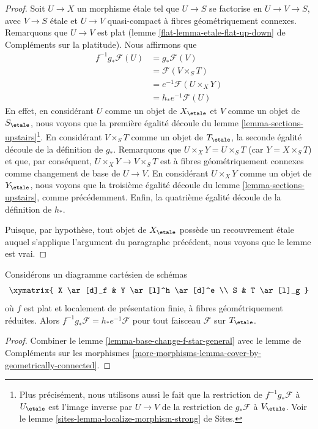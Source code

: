 \begin{proof}
Soit $U \to X$ un morphisme étale tel que $U \to S$ se factorise en
$U \to V \to S$, avec $V \to S$ étale et $U \to V$ quasi-compact
à fibres géométriquement connexes. Remarquons que $U \to V$ est plat
(lemme \ref{flat-lemma-etale-flat-up-down} de Compléments sur la platitude).
Nous affirmons que
\begin{align*}
f^{-1}g_*\mathcal{F}(U)
& = g_*\mathcal{F}(V) \\
& = \mathcal{F}(V \times_S T) \\
& = e^{-1}\mathcal{F}(U \times_X Y) \\
& = h_*e^{-1}\mathcal{F}(U)
\end{align*}
En effet, en considérant $U$ comme un objet de $X_\etale$ et
$V$ comme un objet de $S_\etale$, nous voyons que la première égalité
découle du lemme \ref{lemma-sections-upstairs}\footnote{Plus
précisément, nous utilisons aussi le fait que la restriction de $f^{-1}g_*\mathcal{F}$
à $U_\etale$ est l'image inverse par $U \to V$ de la restriction de
$g_*\mathcal{F}$ à $V_\etale$. Voir le
lemme \ref{sites-lemma-localize-morphism-strong} de Sites.}.
En considérant $V \times_S T$ comme un objet de $T_\etale$,
la seconde égalité découle de la définition de $g_*$.
Remarquons que $U \times_X Y = U \times_S T$ (car $Y = X \times_S T$)
et que, par conséquent, $U \times_X Y \to V \times_S T$
est à fibres géométriquement connexes comme changement de base de $U \to V$.
En considérant $U \times_X Y$ comme un objet de $Y_\etale$, nous voyons que
la troisième égalité découle du lemme \ref{lemma-sections-upstairs},
comme précédemment. Enfin, la quatrième égalité découle de la définition
de $h_*$.

\medskip\noindent
Puisque, par hypothèse, tout objet de $X_\etale$ possède un recouvrement
étale auquel s'applique l'argument du paragraphe précédent,
nous voyons que le lemme est vrai.
\end{proof}

\begin{lemma}
\label{lemma-fppf-reduced-fibres-base-change-f-star}
Considérons un diagramme cartésien de schémas
$$
\xymatrix{
X \ar[d]_f & Y \ar[l]^h \ar[d]^e \\
S & T \ar[l]_g
}
$$
où $f$ est plat et localement de présentation finie,
à fibres géométriquement réduites.
Alors $f^{-1}g_*\mathcal{F} = h_*e^{-1}\mathcal{F}$
pour tout faisceau $\mathcal{F}$ sur $T_\etale$.
\end{lemma}

\begin{proof}
Combiner le lemme \ref{lemma-base-change-f-star-general} avec le
lemme de Compléments sur les morphismes
\ref{more-morphisms-lemma-cover-by-geometrically-connected}.
\end{proof}


